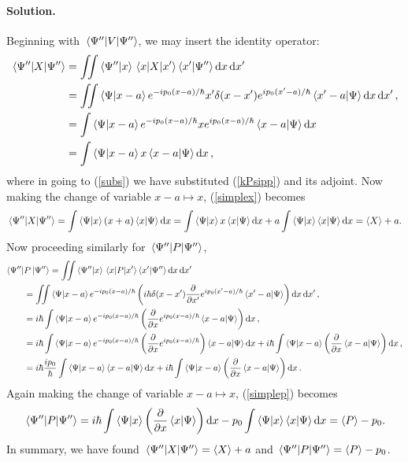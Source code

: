 \documentclass[11pt]{article}
\newcommand{\refeq}[1]{(\ref{#1})}
\newenvironment{solution}
{
    \paragraph{Solution.}
    \ignorespaces
}
{
}
\begin{document}
\begin{solution}
	Beginning with $\ev{V}{\Psi''}$, we may insert the identity operator:
	\begin{align}
		\ev{X}{\Psi''} &= \iint \braket{\Psi''}{x} \mel{x}{X}{x'} \braket{x'}{\Psi''} \dd{x} \dd{x'} \\
		&= \iint \braket{\Psi}{x - a} e^{-i \po (x - a) / \hbar} x' \delta(x - x') e^{i \po (x' - a) / \hbar} \braket{x' - a}{\Psi} \dd{x} \dd{x'}, \label{subs} \\
		&= \int \braket{\Psi}{x - a} e^{-i \po (x - a) / \hbar} x e^{i \po (x - a) / \hbar} \braket{x - a}{\Psi} \dd{x} \\
		&= \int \braket{\Psi}{x - a} x \braket{x - a}{\Psi} \dd{x}, \label{simplex}
	\end{align}
	where in going to \refeq{subs} we have substituted \refeq{kPsipp} and its adjoint.  Now making the change of variable $x - a \mapsto x$, \refeq{simplex} becomes
	\begin{equation}
		\ev{X}{\Psi''} = \int \braket{\Psi}{x} (x + a) \braket{x}{\Psi} \dd{x} = \int \braket{\Psi}{x} x \braket{x}{\Psi} \dd{x} + a \int \braket{\Psi}{x}\braket{x}{\Psi} \dd{x} = \ev{X} + a.
	\end{equation}
	Now proceeding similarly for $\ev{P}{\Psi''}$,
	\begin{align}
		\bra{\Psi''}&{P}\ket{\Psi''} = \iint \braket{\Psi''}{x} \mel{x}{P}{x'} \braket{x'}{\Psi''} \dd{x} \dd{x'} \\
		&= \iint \braket{\Psi}{x - a} e^{-i p_0 (x - a) / \hbar} \left( i \hbar \delta(x - x') \pdv{}{x'} e^{i p_0 (x' - a) / \hbar} \braket{x' - a}{\Psi} \right) \dd{x} \dd{x'}, \\
		&= i \hbar \int \braket{\Psi}{x - a} e^{-i p_0 (x - a) / \hbar} \left(\pdv{}{x} e^{i p_0 (x - a) / \hbar} \braket{x - a}{\Psi} \right) \dd{x}, \\
		&= i \hbar \int \braket{\Psi}{x - a} e^{-i p_0 (x - a) / \hbar} \left(\pdv{}{x} e^{i p_0 (x - a) / \hbar} \right) \braket{x - a}{\Psi} \dd{x} + i \hbar \int \braket{\Psi}{x - a} \left(\pdv{}{x} \braket{x - a}{\Psi} \right) \dd{x}, \\
		&= i \hbar \frac{i p_0}{\hbar} \int \braket{\Psi}{x - a} \braket{x - a}{\Psi} \dd{x} + i \hbar \int \braket{\Psi}{x - a} \left(\pdv{}{x} \braket{x - a}{\Psi} \right) \dd{x}. \label{simplep}
	\end{align}
	Again making the change of variable $x - a \mapsto x$, \refeq{simplep} becomes
	\begin{equation}
		\ev{P}{\Psi''} = \ihb \int \braket{\Psi}{x} \left(\pdv{}{x} \braket{x}{\Psi} \right) \dd{x} - \po \int \braket{\Psi}{x} \braket{x}{\Psi} \dd{x} = \ev{P} - \po.
	\end{equation}
	In summary, we have found $\ev{X}{\Psi''} = \ev{X} + a$ and $\ev{P}{\Psi''} = \ev{P} - \po$.
\end{solution}
\end{document}
